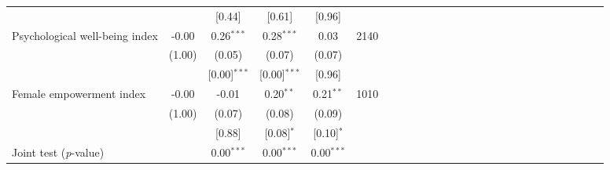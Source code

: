 {\begin{tabular}{l*{5}{SSSSc}}
          &         &   [0.44]&   [0.61]&   [0.96]&         \\
Psychological well-being index&    -0.00&0.26$^{***}$&0.28$^{***}$&     0.03&     2140\\
          &   (1.00)&   (0.05)&   (0.07)&   (0.07)&         \\
          &         &[0.00]$^{***}$&[0.00]$^{***}$&   [0.96]&         \\
Female empowerment index&    -0.00&    -0.01&0.20$^{**}$&0.21$^{**}$&     1010\\
          &   (1.00)&   (0.07)&   (0.08)&   (0.09)&         \\
          &         &   [0.88]&[0.08]$^{*}$&[0.10]$^{*}$&         \\
\midrule Joint test (\emph{p}-value)&         &{0.00$^{***}$}&{0.00$^{***}$}&{0.00$^{***}$}&         \\
\bottomrule
\end{tabular}
}
